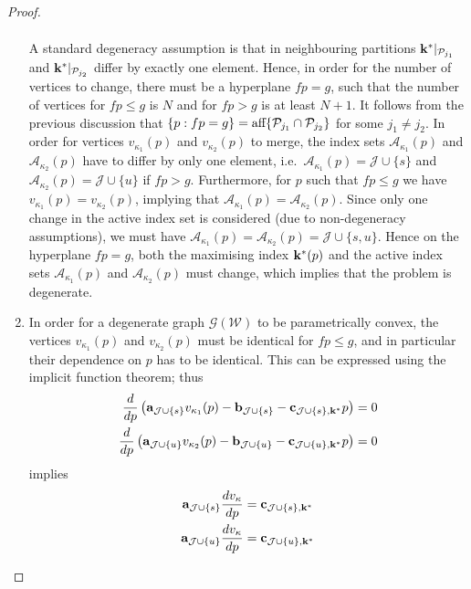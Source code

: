 \documentclass[journal]{IEEEtran}
\theoremstyle{remark}
\theoremstyle{definition}
\begin{document}
\begin{proof}
\begin{enumerate}
\begin{equation*}
\begin{split}
\end{split}\end{equation*}
%
%
A standard degeneracy assumption is that in neighbouring partitions ${\bf{k}}^\ast\vert_{\mathcal P_{j_1}}$
and ${\bf{k}}^\ast\vert_{\mathcal P_{j_2}}$ differ by exactly one element.
%
Hence, in order for the number of vertices to change, there must be a hyperplane $fp=g$, such that the number of vertices for $fp \leq g$ is 
$N$ and for $fp>g$ is at least $N+1$.
%
It follows from the previous discussion that $\{p:fp=g\} = \textup{aff}\{\mathcal P_{j_1}\cap\mathcal P_{j_2}\}$ for some $j_1\neq j_2$.
%
In order for vertices $v_{\kappa_1}(p)$ and $v_{\kappa_2}(p)$ to merge, the index sets $\mathcal A_{\kappa_1}(p)$ and 
$\mathcal A_{\kappa_2}(p)$ have to differ by only one 
element, i.e.\ $\mathcal A_{\kappa_1}(p) = \mathcal J\cup \{s\}$ and $\mathcal A_{\kappa_2}(p) = \mathcal J\cup\{u\}$ if $fp>g$.
%
Furthermore, for $p$ such that $fp\leq g$ we have $v_{\kappa_1}(p)=v_{\kappa_2}(p)$, implying that $\mathcal A_{\kappa_1}(p) = 
\mathcal A_{\kappa_2}(p)$.
%
Since only one change in the active index set is considered (due to non-degeneracy assumptions), we must have
$\mathcal A_{\kappa_1}(p) = \mathcal A_{\kappa_2}(p) = \mathcal J \cup \{s,u\}$.
%
Hence on the hyperplane $fp=g$, both the maximising index ${\bf{k}}^\ast(p)$ and the active index sets $\mathcal A_{\kappa_1}(p)$ 
and $\mathcal A_{\kappa_2}(p)$ must change, which implies that the problem is degenerate.
%
\item In order for a degenerate graph $\mathscr G(\mathcal W)$ to be parametrically convex, the vertices $v_{\kappa_1}(p)$ and $v_{\kappa_2}(p)$ must be identical for $fp\leq g$, and in particular their dependence on $p$ has to be identical.
%
This can be expressed using the implicit function theorem; thus
%
\begin{align*}
  \frac{d}{dp}\left(  {\bf{a}}_{\mathcal J\cup \{s\}} v_{\kappa_1}(p) - {\bf{b}}_{\mathcal J\cup \{s\}} - 
  {\bf{c}}_{\mathcal J\cup \{s\},{\bf{k}}^\ast} p\right) &= 0\\
  \frac{d}{dp}\left(  {\bf{a}}_{\mathcal J\cup \{u\}} v_{\kappa_2}(p) - {\bf{b}}_{\mathcal J\cup \{u\}} - 
  {\bf{c}}_{\mathcal J\cup \{u\},{\bf{k}}^\ast} p\right) &= 0
\end{align*}
%
implies
\begin{align*}
  {\bf{a}}_{\mathcal J\cup \{s\}} \frac{dv_{\kappa}}{dp} &= {\bf{c}}_{\mathcal J\cup \{s\},{\bf{k}}^\ast}\\
  {\bf{a}}_{\mathcal J\cup \{u\}} \frac{dv_{\kappa}}{dp} &= {\bf{c}}_{\mathcal J\cup \{u\},{\bf{k}}^\ast}

\end{align*}
\end{enumerate}
\end{proof}
\end{document}
